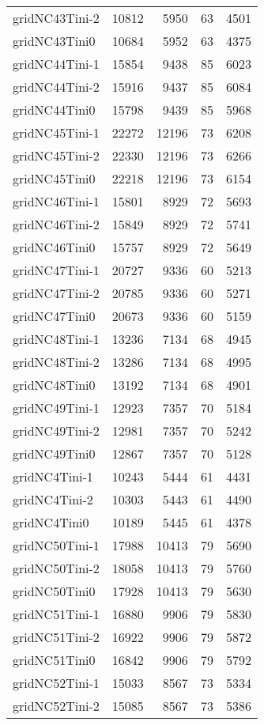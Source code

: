 \begin{longtable}{lrrrr}
gridNC43Tini-2 & 10812 & 5950 & 63 & 4501 \\
gridNC43Tini0 & 10684 & 5952 & 63 & 4375 \\
gridNC44Tini-1 & 15854 & 9438 & 85 & 6023 \\
gridNC44Tini-2 & 15916 & 9437 & 85 & 6084 \\
gridNC44Tini0 & 15798 & 9439 & 85 & 5968 \\
gridNC45Tini-1 & 22272 & 12196 & 73 & 6208 \\
gridNC45Tini-2 & 22330 & 12196 & 73 & 6266 \\
gridNC45Tini0 & 22218 & 12196 & 73 & 6154 \\
gridNC46Tini-1 & 15801 & 8929 & 72 & 5693 \\
gridNC46Tini-2 & 15849 & 8929 & 72 & 5741 \\
gridNC46Tini0 & 15757 & 8929 & 72 & 5649 \\
gridNC47Tini-1 & 20727 & 9336 & 60 & 5213 \\
gridNC47Tini-2 & 20785 & 9336 & 60 & 5271 \\
gridNC47Tini0 & 20673 & 9336 & 60 & 5159 \\
gridNC48Tini-1 & 13236 & 7134 & 68 & 4945 \\
gridNC48Tini-2 & 13286 & 7134 & 68 & 4995 \\
gridNC48Tini0 & 13192 & 7134 & 68 & 4901 \\
gridNC49Tini-1 & 12923 & 7357 & 70 & 5184 \\
gridNC49Tini-2 & 12981 & 7357 & 70 & 5242 \\
gridNC49Tini0 & 12867 & 7357 & 70 & 5128 \\
gridNC4Tini-1 & 10243 & 5444 & 61 & 4431 \\
gridNC4Tini-2 & 10303 & 5443 & 61 & 4490 \\
gridNC4Tini0 & 10189 & 5445 & 61 & 4378 \\
gridNC50Tini-1 & 17988 & 10413 & 79 & 5690 \\
gridNC50Tini-2 & 18058 & 10413 & 79 & 5760 \\
gridNC50Tini0 & 17928 & 10413 & 79 & 5630 \\
gridNC51Tini-1 & 16880 & 9906 & 79 & 5830 \\
gridNC51Tini-2 & 16922 & 9906 & 79 & 5872 \\
gridNC51Tini0 & 16842 & 9906 & 79 & 5792 \\
gridNC52Tini-1 & 15033 & 8567 & 73 & 5334 \\
gridNC52Tini-2 & 15085 & 8567 & 73 & 5386 \\

\end{longtable}
